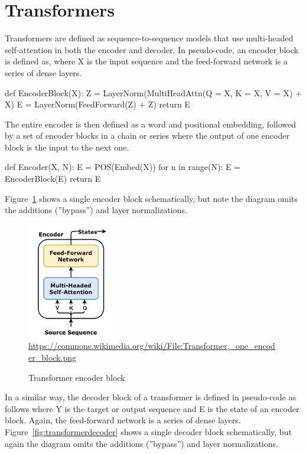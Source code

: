 \section{Transformers}

Transformers are defined as sequence-to-sequence models that use multi-headed self-attention in both the encoder and decoder. In pseudo-code, an encoder block is defined as, where X is the input sequence and the feed-forward network is a series of dense layers.

\begin{textcode}
def EncoderBlock(X):
  Z = LayerNorm(MultiHeadAttn(Q = X, K = X, V = X) + X)
  E = LayerNorm(FeedForward(Z) + Z)
  return E
\end{textcode}

The entire encoder is then defined as a word and positional embedding, followed by a set of encoder blocks in a chain or series where the output of one encoder block is the input to the next one. 

\begin{textcode}
def Encoder(X, N):
  E = POS(Embed(X))
  for n in range(N):
    E = EncoderBlock(E)
  return E
\end{textcode}

Figure~\ref{fig:transformerencoder} shows a single encoder block schematically, but note the diagram omits the additions (''bypass'') and layer normalizations. 

\begin{figure}
\centering
\includegraphics[height=2in]{Transformer,_one_encoder_block.png} \\

\scriptsize \url{https://commons.wikimedia.org/wiki/File:Transformer,_one_encoder_block.png}\normalsize
\caption{Transformer encoder block}
\label{fig:transformerencoder}
\end{figure}

In a similar way, the decoder block of a transformer is defined in pseudo-code as follows where Y is the target or output sequence and E is the state of an encoder block. Again, the feed-forward network is a series of dense layers. Figure~\ref{fig:transformerdecoder} shows a single decoder block schematically, but again the diagram omits the additions (''bypass'') and layer normalizations.

